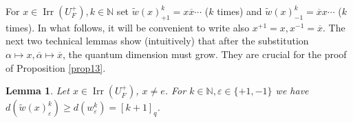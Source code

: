 \documentclass[11 pt, leqno]{amsart}
\newcommand{\eps}{\varepsilon}
\newcommand{\ov}{\overline}
\newcommand{\NN}{\mathbb{N}}
\DeclareMathOperator{\Irr}{Irr}
\newtheorem{lemma}[theorem]{Lemma}
\theoremstyle{definition}
\numberwithin{equation}{section}
\begin{document}
For $x\in \Irr(U_F^+),k\in\NN$ set $\widetilde{w}(x)^k_{+1}=x \ov{x} \cdots $ ($k$ times) and $\widetilde{w}(x)^k_{-1}=\ov{x} x \cdots$ ($k$ times). In what follows, it will be convenient to write also $x^{+1}=x, x^{-1}=\ov{x}$. The next two technical lemmas show (intuitively) that after the substitution $\alpha\mapsto x, \ov\alpha\mapsto \ov x$, the quantum dimension must grow. They are crucial for the proof of Proposition \ref{prop13}.

\begin{lemma}\label{lemma11}
Let $x\in \Irr(U_F^+)$, $x \neq e$. %
For $k\in\NN,\eps\in \{+1,-1\}$ we have $d(\widetilde{w}(x)^k_\eps) \ge d(w^k_\eps)=[k+1]_q$.
\end{lemma}
\end{document}
